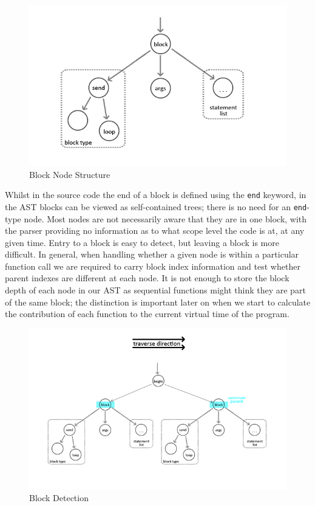 \documentclass[11pt, abstracton, twoside, titlepage=true]{scrartcl}
\begin{document}
\begin{figure}[h!]
	\centering
	\includegraphics[width=\textwidth]{images/Block.jpg}
	\caption{Block Node Structure} \label{blocks}
\end{figure}

Whilst in the source code the end of a block is defined using the \texttt{end}
keyword, in the AST blocks can be viewed as self-contained trees; there is
no need for an \texttt{end}-type node. Most nodes are not necessarily aware
that they are in one block, with the parser providing no information
as to what scope level the code is at, at any given time. Entry to a block is
easy to detect, but leaving a block is more difficult. In general, when handling
whether a given node is within a particular function call we are required to
carry block index information and test whether parent indexes are different
at each node. It is not enough to store the block depth of each node in our AST
as sequential functions might think they are part of the same block; the
distinction is important later on when we start to calculate the contribution
of each function to the current virtual time of the program.

\begin{figure}[h!]
	\centering
	\includegraphics[width=\textwidth]{images/BlkDetection.jpg}
	\caption{Block Detection} \label{blockdetect}
\end{figure}
\end{document}
